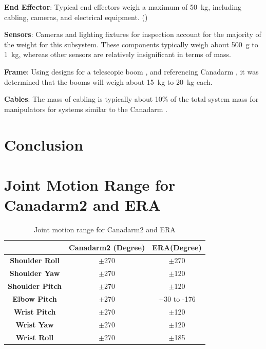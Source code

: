 \documentclass[12pt, letterpaper]{article}
\begin{document}
\textbf{End Effector}: Typical end effectors weigh a maximum of \SI{50}{\kilo\gram}, including cabling, cameras, and electrical equipment. ()

\textbf{Sensors}: Cameras and lighting fixtures for inspection account for the majority of the weight for this subsystem. These components typically weigh about \SI{500}{\gram} to \SI{1}{\kilo\gram}, whereas other sensors are relatively insignificant in terms of mass.  \cite{cameras}

\textbf{Frame}: Using designs for a telescopic boom \cite{ESM_telescopic}, and referencing Canadarm \cite{IEEE_Carm}, it was determined that the booms will weigh about \SI{15}{\kilo\gram} to \SI{20}{\kilo\gram} each.

\textbf{Cables}: The mass of cabling is typically about 10\% of the total system mass for manipulators for systems similar to the Canadarm \cite{IEEE_RMSperformance}.

\section{Conclusion}
\label{sect:conclusion}


\newpage



\newpage
\appendix



\section{Joint Motion Range for Canadarm2 and ERA}
\label{app:jointrange}
\begin{table}[H]
\centering
\caption{Joint motion range for Canadarm2 and ERA}
\begin{tabular}{|c|c|c|}
\toprule
	&	\textbf{Canadarm2 (Degree)}	&	\textbf{ERA(Degree)}	\\\midrule
\textbf{Shoulder Roll}	&	$\pm$270	&	$\pm$270	\\
\textbf{Shoulder Yaw}	&	$\pm$270	&	$\pm$120	\\
\textbf{Shoulder Pitch}	&	$\pm$270	&	$\pm$120	\\
\textbf{Elbow Pitch}	&	$\pm$270	&	+30 to -176	\\
\textbf{Wrist Pitch}	&	$\pm$270	&	$\pm$120	\\
\textbf{Wrist Yaw}	&	$\pm$270	&	$\pm$120	\\
\textbf{Wrist Roll}	&	$\pm$270	&	$\pm$185	\\\bottomrule
\end{tabular}
\label{table:jointrange}
\end{table}
\end{document}
